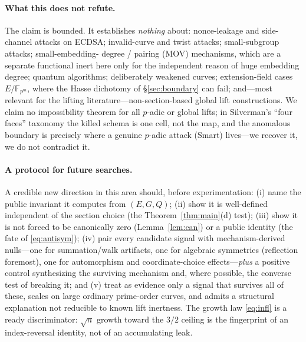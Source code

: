 \documentclass[11pt]{article}
\theoremstyle{definition}
\begin{document}
\paragraph{What this does not refute.} The claim is bounded. It establishes
\emph{nothing} about: nonce-leakage and side-channel attacks on ECDSA;
invalid-curve and twist attacks; small-subgroup attacks; small-embedding-%
degree / pairing (MOV) mechanisms, which are a separate functional inert
here only for the independent reason of huge embedding degree; quantum
algorithms; deliberately weakened curves; extension-field cases
$E/\mathbb F_{p^m}$, where the Hasse dichotomy of \S\ref{sec:boundary} can
fail; and---most relevant for the lifting literature---non-section-based
global lift constructions. We claim no impossibility theorem for all
$p$-adic or global lifts; in Silverman's ``four faces'' taxonomy
\cite{silvermanlift,silverman4faces} the killed schema is one cell, not
the map, and the anomalous boundary is precisely where a genuine $p$-adic
attack (Smart) lives---we recover it, we do not contradict it.

\paragraph{A protocol for future searches.} A credible new direction in
this area should, before experimentation: (i) name the public invariant it
computes from $(E,G,Q)$; (ii) show it is well-defined independent of the
section choice (the Theorem~\ref{thm:main}(d) test); (iii) show it is not
forced to be canonically zero (Lemma~\ref{lem:can}) or a public identity
(the fate of \eqref{eq:antisym}); (iv) pair every candidate signal with
mechanism-derived nulls---one for summation/walk artifacts, one for
algebraic symmetries (reflection foremost), one for automorphism and
coordinate-choice effects---\emph{plus} a positive control synthesizing the
surviving mechanism and, where possible, the converse test of breaking it;
and (v) treat as evidence only a signal that survives all of these, scales
on large ordinary prime-order curves, and admits a structural explanation
not reducible to known lift inertness. The growth law \eqref{eq:infl} is a
ready discriminator: $\sqrt n$ growth toward the $3/2$ ceiling is the
fingerprint of an index-reversal identity, not of an accumulating leak.
\end{document}
